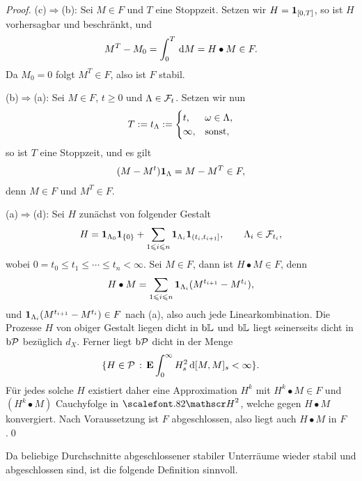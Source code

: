 \begin{proof}
(c)$\Rightarrow$(b): Sei $M\in F$ und $T$ eine Stoppzeit. Setzen wir $H =
\mathbf{1}_{[0,T]}$, so ist $H$ vorhersagbar und beschränkt, und
\begin{align*}
M^T - M_0 = \int_0^T \,\mathrm{d} M = H\bullet M \in F.
\end{align*}
Da $M_0 = 0$ folgt $M^T \in F$, also ist $F$ stabil.

(b)$\Rightarrow$(a): Sei $M\in F$, $t\ge 0$ und $\Lambda\in\mathcal{F}_t$. Setzen wir
nun
\begin{align*}
T := t_\Lambda :=
\begin{cases}
t, & \omega\in\Lambda,\\
\infty, & \text{sonst},
\end{cases}
\end{align*}
so ist $T$ eine Stoppzeit, und es gilt
\begin{align*}
(M-M^t)\mathbf{1}_{\Lambda} = M-M^T \in F,
\end{align*}
denn $M\in F$ und $M^T\in F$.

(a)$\Rightarrow$(d): Sei $H$ zunächst von folgender Gestalt
\begin{align*}
H = \mathbf{1}_{\Lambda_0}\mathbf{1}_{\{0\}} + \sum_{1\leqslant i\leqslant n} \mathbf{1}_{\Lambda_i}
\mathbf{1}_{(t_i,t_{i+1}]},\qquad \Lambda_{i}\in\mathcal{F}_{t_i},
\end{align*}
wobei $0 = t_0 \le t_1 \le \cdots \le t_n < \infty$. Sei $M\in F$, dann ist
$H\bullet M\in F$, denn
\begin{align*}
H\bullet M = \sum_{1\leqslant i\leqslant n} \mathbf{1}_{\Lambda_i}(M^{t_{i+1}}-M^{t_i}),
\end{align*}
und $\mathbf{1}_{\Lambda_i}(M^{t_{i+1}}-M^{t_i}) \in F$ nach (a), also auch jede
Linearkombination. Die Prozesse $H$ von obiger Gestalt liegen dicht in $\mathrm{b}\mathbb{L}$ und
$\mathrm{b}\mathbb{L}$ liegt seinerseits dicht in $\mathrm{b}\mathcal{P}$ bezüglich $d_X$. Ferner liegt $\mathrm{b}\mathcal{P}$
dicht in der Menge
\begin{align*}
\setdef{H\in\PP}{\E\int_0^\infty H_s^2 \,\diffd[M,M]_s < \infty}.
\end{align*}
Für jedes solche $H$ existiert daher eine Approximation $H^k$ mit $H^k\bullet
M\in F$ und $(H^k\bullet M)$ Cauchyfolge in $\HH^2$, welche gegen $H\bullet M$
konvergiert. Nach Voraussetzung ist $F$ abgeschlossen, also liegt auch
$H\bullet M$ in $F$.\qed
\end{proof}

Da beliebige Durchschnitte abgeschlossener stabiler Unterräume wieder
stabil und abgeschlossen sind, ist die folgende Definition sinnvoll.

